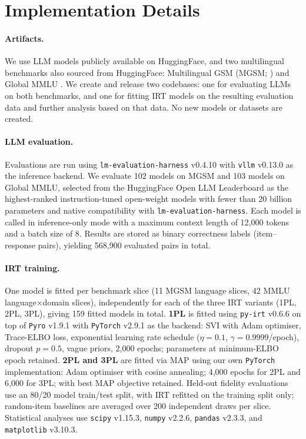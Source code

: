 \documentclass[11pt]{article}
\begin{document}
\section{Implementation Details}
\label{app:techdetails}

\paragraph{Artifacts.}
We use LLM models publicly available on HuggingFace, and two multilingual
benchmarks also sourced from HuggingFace: Multilingual GSM
(MGSM; \citealt{shi2023language}) and Global MMLU
\cite{singh2025global}. We create and release two codebases: one for evaluating LLMs on both benchmarks, and one for fitting IRT models on the resulting evaluation data and further analysis based on that data. No new models or datasets are created.

\paragraph{LLM evaluation.} Evaluations are run using \texttt{lm-evaluation-harness} v0.4.10
\cite{eval-harness} with \texttt{vllm} v0.13.0 as the inference backend.
We evaluate 102 models on MGSM and 103 models on Global MMLU, selected
from the HuggingFace Open LLM Leaderboard as the highest-ranked
instruction-tuned open-weight models with fewer than 20 billion
parameters and native compatibility with \texttt{lm-evaluation-harness}.
Each model is called in inference-only mode with a maximum context
length of 12{,}000 tokens and a batch size of 8.
Results are stored as binary correctness labels (item--response pairs),
yielding 568{,}900 evaluated pairs in total.

\paragraph{IRT training.}
One model is fitted per benchmark slice (11 MGSM language slices,
42 MMLU language$\times$domain slices), independently for each of the
three IRT variants (1PL, 2PL, 3PL), giving 159 fitted models in total.
\textbf{1PL} is fitted using \texttt{py-irt} v0.6.6 \cite{natesan2016bayesian}
on top of \texttt{Pyro} v1.9.1 \cite{bingham2019pyro} with \texttt{PyTorch} v2.9.1
as the backend: SVI with Adam optimiser, Trace-ELBO loss, exponential learning rate
schedule ($\eta = 0.1$, $\gamma = 0.9999$/epoch), dropout $p = 0.5$, vague priors,
2{,}000 epochs; parameters at minimum-ELBO epoch retained.
\textbf{2PL and 3PL} are fitted via MAP using our own \texttt{PyTorch} implementation:
Adam optimiser with cosine annealing; 4{,}000 epochs for 2PL and 6{,}000 for 3PL; with best MAP objective retained. Held-out fidelity evaluations use an 80/20 model train/test split, with IRT refitted on the training split only; random-item baselines are averaged over 200 independent draws per slice. Statistical analyses use \texttt{scipy} v1.15.3, \texttt{numpy} v2.2.6, \texttt{pandas} v2.3.3, and \texttt{matplotlib} v3.10.3.
\end{document}

